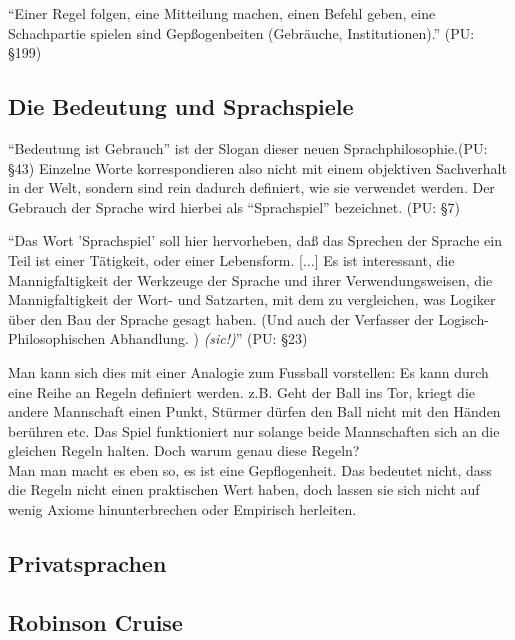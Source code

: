 \documentclass[a4paper,12pt]{article}
\begin{document}
\begin{displayquote}
\enquote{Einer Regel folgen, eine Mitteilung machen, einen Befehl geben, eine Schachpartie spielen sind Gepßogenbeiten (Gebräuche, Institutionen).} (PU: §199)
\end{displayquote}


\subsection{Die Bedeutung und Sprachspiele}
\enquote{Bedeutung ist Gebrauch} ist der Slogan dieser neuen Sprachphilosophie.(PU: §43) Einzelne Worte korrespondieren also nicht mit einem objektiven Sachverhalt in der Welt, sondern sind rein dadurch definiert, wie sie verwendet werden. Der Gebrauch der Sprache wird hierbei als \enquote{Sprachspiel} bezeichnet. (PU: §7)

\begin{displayquote}
\enquote{Das Wort 'Sprachspiel' soll hier hervorheben, daß das Sprechen
der Sprache ein Teil ist einer Tätigkeit, oder einer Lebensform. [...]
Es ist interessant, die Mannigfaltigkeit der Werkzeuge der Sprache
und ihrer Verwendungsweisen, die Mannigfaltigkeit der Wort- und
Satzarten, mit dem zu vergleichen, was Logiker über den Bau der
Sprache gesagt haben. (Und auch der Verfasser der Logisch-Philosophischen Abhandlung. ) \textit{(sic!)}} (PU: §23)
\end{displayquote}

Man kann sich dies mit einer Analogie zum Fussball vorstellen: Es kann durch eine Reihe an Regeln definiert werden. z.B. Geht der Ball ins Tor, kriegt die andere Mannschaft einen Punkt, Stürmer dürfen den Ball nicht mit den Händen berühren etc. Das Spiel funktioniert nur solange beide Mannschaften sich an die gleichen Regeln halten. Doch warum genau diese Regeln? \\ Man man macht es eben so, es ist eine Gepflogenheit. Das bedeutet nicht, dass die Regeln nicht einen praktischen Wert haben, doch lassen sie sich nicht auf wenig Axiome hinunterbrechen oder Empirisch herleiten.


\subsection{Privatsprachen}
\blindtext[1]

\subsection{Robinson Cruise}
\blindtext[1]
\end{document}
